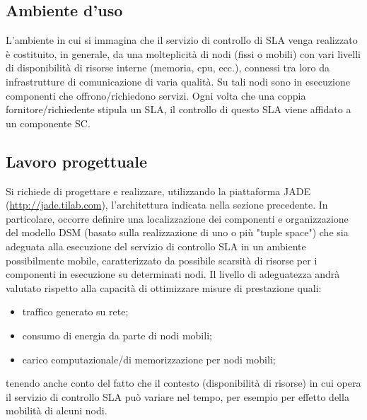 \subsection{Ambiente d'uso}
L’ambiente in cui si immagina che il servizio di controllo di SLA venga realizzato è costituito, in generale, da una molteplicità di nodi (fissi o mobili) con vari livelli di disponibilità di risorse interne (memoria, cpu, ecc.), connessi tra loro da infrastrutture di comunicazione di varia qualità. Su tali nodi sono in esecuzione componenti che offrono/richiedono servizi. Ogni volta che una coppia fornitore/richiedente stipula un SLA, il controllo di questo SLA viene affidato a un componente SC.
\subsection{Lavoro progettuale}
Si richiede di progettare e realizzare, utilizzando la piattaforma JADE (\url{http://jade.tilab.com}), l’architettura indicata nella sezione precedente. In particolare, occorre definire una localizzazione dei componenti e organizzazione del modello DSM (basato sulla realizzazione di uno o più "tuple space") che sia adeguata alla esecuzione del servizio di controllo SLA in un ambiente possibilmente mobile, caratterizzato da possibile scarsità di risorse per i componenti in esecuzione su determinati nodi. Il livello di adeguatezza andrà valutato rispetto alla capacità di ottimizzare misure di prestazione quali:
\begin{itemize}
\item traffico generato su rete;
\item consumo di energia da parte di nodi mobili;
\item carico computazionale/di memorizzazione per nodi mobili;
\end{itemize}
tenendo anche conto del fatto che il contesto (disponibilità di risorse) in cui opera il servizio di controllo SLA può variare nel tempo, per esempio per effetto della mobilità di alcuni nodi.
